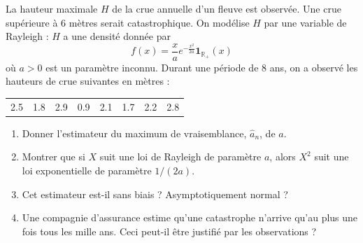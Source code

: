 \smallskip

\begin{mdframed}
\begin{exercice}
La hauteur maximale $H$ de la crue annuelle d'un fleuve est observée. Une crue supérieure à 6 mètres serait catastrophique. On modélise $H$ par une variable de Rayleigh : $H$ a une densité donnée par
\begin{equation*}
f(x) = \frac{x}{a} e^{-\frac{x^2}{2a}} \mathbf{1}_{\mathbb{R}_+}(x)
\end{equation*}
où $a > 0$ est un paramètre inconnu. Durant une période de 8 ans, on a observé les hauteurs de crue suivantes en mètres :
\begin{center}
\begin{tabular}{cccccccc}
2.5 & 1.8 & 2.9 & 0.9 & 2.1 & 1.7 & 2.2 & 2.8
\end{tabular}
\end{center}

\begin{enumerate}
    \item Donner l'estimateur du maximum de vraisemblance, $\hat{a}_n$, de $a$.
    \item Montrer que si $X$ suit une loi de Rayleigh de paramètre $a$, alors $X^2$ suit une loi exponentielle de paramètre $1/(2a)$.
    \item Cet estimateur est-il sans biais ? Asymptotiquement normal ?
    \item Une compagnie d'assurance estime qu'une catastrophe n'arrive qu'au plus une fois tous les mille ans. Ceci peut-il être justifié par les observations ?
\end{enumerate}
\end{exercice}
\end{mdframed}